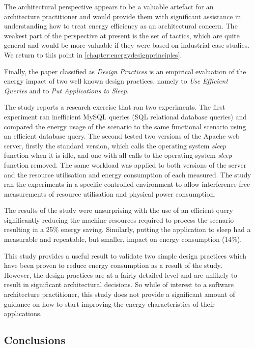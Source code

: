 The architectural perspective appears to be a valuable artefact for an architecture practitioner and would provide them with significant assistance in understanding how to treat energy efficiency as an architectural concern.  The weakest part of the perspective at present is the set of tactics, which are quite general and would be more valuable if they were based on industrial case studies.  We return to this point in \cref{chapter:energydesignprinciples}.

Finally, the paper classified as \emph{Design Practices} is an empirical evaluation of the energy impact of two well known design practices, namely to \emph{Use Efficient Queries} and to \emph{Put Applications to Sleep}.  

The study reports a research exercise that ran two experiments.  The first experiment ran inefficient MySQL queries (SQL relational database queries) and compared the energy usage of the scenario to the same functional scenario using an efficient database query.  The second tested two versions of the Apache web server, firstly the standard version, which calls the operating system \emph{sleep} function when it is idle, and one with all calls to the operating system \emph{sleep} function removed.  The same workload was applied to both versions of the server and the resource utilisation and energy consumption of each measured.  The study ran the experiments in a specific controlled environment to allow interference-free measurements of resource utilisation and physical power consumption.

The results of the study were unsurprising with the use of an efficient query significantly reducing the machine resources required to process the scenario resulting in a 25\% energy saving.  Similarly, putting the application to sleep had a measurable and repeatable, but smaller, impact on energy consumption (14\%).

This study provides a useful result to validate two simple design practices which have been proven to reduce energy consumption as a result of the study.  However, the design practices are at a fairly detailed level and are unlikely to result in significant architectural decisions.  So while of interest to a software architecture practitioner, this study does not provide a significant amount of guidance on how to start improving the energy characteristics of their applications.

\subsection{Conclusions}

